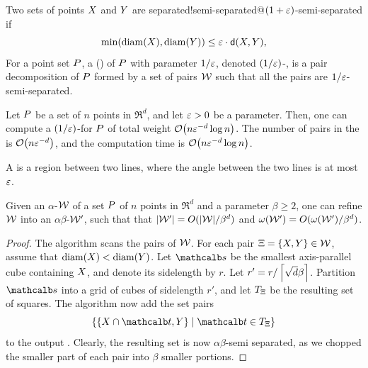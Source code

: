\documentclass[12pt]{article}%
\begin{document}
\begin{defn}%
    Two sets of points $X$ and $Y$ are
    {separated!semi-separated@$(1+\varepsilon)$-semi-separated} if
    \begin{equation*}
        \min \pth{ \diameterX{\PSX}, \diameterX{\PSY} } \leq \eps \cdot
        \dsY{\PSX}{\PSY},%
    \end{equation*}
    For a point set $P$, a  (\emphOnly{\SSPD{}}) of $P$ with parameter
    $1/\varepsilon$, denoted $(1/\varepsilon)$-\SSPD, is a pair decomposition of
    $P$ formed by a set of pairs $\mathcal{W}$ such that all the pairs are
    $1/\varepsilon$-semi-separated.
\end{defn}

\begin{theorem}
    Let $P$ be a set of $n$ points in $\Re^d$, and let $\varepsilon > 0$ be
    a parameter. Then, one can compute a $(1/\varepsilon)$-\SSPD for $P$ of
    total weight $\Of\pth{n \eps^{-d} \log n}$. The number of pairs in
    the \SSPD is $\Of\pth{n \eps^{-d}}$, and the computation time is
    $\Of\pth{ n \eps^{-d} \log n }$.
\end{theorem}

\begin{defn}%
    A  is a region between two lines, where
    the angle between the two lines is at most $\varepsilon$.
\end{defn}

\begin{lemma}
    Given an $\alpha$-\SSPD $\mathcal{W}$ of a set $P$ of $n$ points in
    $\Re^d$ and a parameter $\beta \geq 2$, one can refine $\mathcal{W}$ into
    an $\alpha\beta$-\SSPD $\mathcal{W}'$, such that that
    $|\mathcal{W}'| = O(|\mathcal{W}|/\beta^d)$ and
    $\WeightX{\WS'} = O(\WeightX{\WS'}/\beta^d)$.
\end{lemma}
\begin{proof}
    The algorithm scans the pairs of $\mathcal{W}$. For each pair
    $\Xi = \{ X, Y \} \in \mathcal{W}$, assume that
    $\diameterX{\PSX} < \diameterX{\PSY}$. Let $\sqr$ be the smallest
    axis-parallel cube containing $X$, and denote its sidelength by
    $r$.  Let $r' = r / \left\lceil {\sqrt{d} \beta } \right\rceil$.  Partition $\sqr$
    into a grid of cubes of sidelength $r'$, and let $T_\Xi$ be the
    resulting set of squares. The algorithm now add the set pairs
    \begin{equation*}
        \Set{ \{ \PSX \cap \sqrA, \PSY \} }{ \sqrA \in T_\Pair }
    \end{equation*}
    to the output \SSPD. Clearly, the resulting set is now
    $\alpha\beta$-semi separated, as we chopped the smaller part of
    each pair into $\beta$ smaller portions.
\end{proof}
\end{document}
